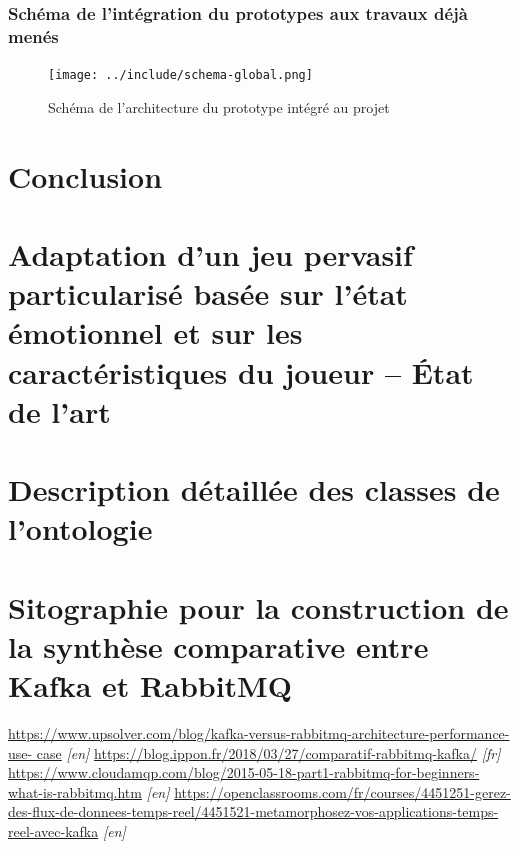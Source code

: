 \documentclass{article}
\begin{document}
		\subsubsection{Schéma de l'intégration du prototypes aux travaux déjà menés}
			\begin{figure}
				\centering
				\texttt{[image: ../include/schema-global.png]}
				\caption{Schéma de l'architecture du prototype intégré au projet}
				\label{fig:archiglobale}
			\end{figure}

\section{Conclusion}



\newpage
\appendix
\section{Adaptation d’un jeu pervasif particularisé basée sur l'état émotionnel et sur les caractéristiques du joueur – État de l’art}\label{ann:eda}
	

\section{Description détaillée des classes de l'ontologie}\label{ann:detailclasses}
	

\section{Sitographie pour la construction de la synthèse comparative entre Kafka et RabbitMQ}\label{ann:kafkarabbitmq}
	\hspace*{-0.5cm}\href{https://www.upsolver.com/blog/kafka-versus-rabbitmq-architecture-performance-use-
	case}{https://www.upsolver.com/blog/kafka-versus-rabbitmq-architecture-performance-use-
	case} \textit{[en]} \medskip\newline
	\href{https://blog.ippon.fr/2018/03/27/comparatif-rabbitmq-kafka/}{https://blog.ippon.fr/2018/03/27/comparatif-rabbitmq-kafka/} \textit{[fr]}\medskip\newline
	\href{https://www.cloudamqp.com/blog/2015-05-18-part1-rabbitmq-for-beginners-what-is-rabbitmq.htm}{https://www.cloudamqp.com/blog/2015-05-18-part1-rabbitmq-for-beginners-what-is-rabbitmq.htm} \textit{[en]}\medskip\newline
	\href{https://openclassrooms.com/fr/courses/4451251-gerez-des-flux-de-donnees-temps-reel/4451521-metamorphosez-vos-applications-temps-reel-avec-kafka}{https://openclassrooms.com/fr/courses/4451251-gerez-des-flux-de-donnees-temps-reel/4451521-metamorphosez-vos-applications-temps-reel-avec-kafka} \textit{[en]}
\end{document}
